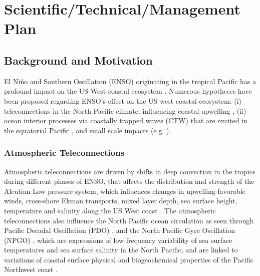 \newpage
\section{Scientific/Technical/Management Plan}

\subsection {Background and Motivation}

El Ni{\~n}o and Southern Oscillation (ENSO) originating in the tropical Pacific has a profound impact on the US West coastal ecosystem \citep{jacox2015enso,bograd2019water,frischknecht2015remote}. Numerous hypotheses have been proposed regarding ENSO’s effect on the US west coastal ecosystem: (i) teleconnections in the North Pacific climate, influencing coastal upwelling \citep{alexander2002atmospheric}, (ii) ocean interior processes via coastally trapped waves (CTW) that are excited in the equatorial Pacific \citep{hermann2009comparison,hickey2003local,hickey2006evolution,frischknecht2015remote}, and small scale impacts (e.g. \citep{small2014new,capet2008mesoscale,capet2004upwelling,bassin2005sub,mooers1984turbulent}).

\subsubsection{Atmospheric Teleconnections}
Atmospheric teleconnections are driven by shifts in deep convection in the tropics during different phases of ENSO, that affects the distribution and strength of the Aleutian Low pressure system, which influences changes in upwelling-favorable winds, cross-shore Ekman transports, mixed layer depth, sea surface height, temperature and salinity along the US West coast \citep{enfield1980structure,emery1985atmospheric,strub2002altimeter,checkley2009patterns}. The atmospheric teleconnections also influence the North Pacific ocean circulation as seen through Pacific Decadal Oscillation (PDO) \citep{alexander2002atmospheric,di2013synthesis}, and the North Pacific Gyre Oscillation (NPGO) \citep{di2013synthesis}, which are expressions of low frequency variability of sea surface temperatures and sea surface salinity in the North Pacific, and are linked to variations of coastal surface physical and biogeochemical properties of the Pacific Northwest coast \citep{di2009nutrient,chhak2009forcing,combes2013cross,chhak2007decadal}. 

